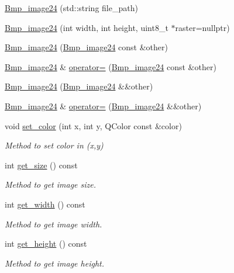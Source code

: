 \begin{DoxyCompactItemize}
\item 
\hyperlink{classBmp__image24_a4790a96366f1e1d8985510ce1e83d576}{Bmp\+\_\+image24} (std\+::string file\+\_\+path)
\item 
\hyperlink{classBmp__image24_a62cde711e1fe6bb462e9330fc6fff5a9}{Bmp\+\_\+image24} (int width, int height, uint8\+\_\+t $\ast$raster=nullptr)
\item 
\hyperlink{classBmp__image24_a10a35b5d6550d4caeb2e1d488dfbf6a4}{Bmp\+\_\+image24} (\hyperlink{classBmp__image24}{Bmp\+\_\+image24} const \&other)
\item 
\hyperlink{classBmp__image24}{Bmp\+\_\+image24} \& \hyperlink{classBmp__image24_a6772b44faac5bbc628b1a433499f6303}{operator=} (\hyperlink{classBmp__image24}{Bmp\+\_\+image24} const \&other)
\item 
\hyperlink{classBmp__image24_a9f725fe5a381fb97c6f65965e1bfe549}{Bmp\+\_\+image24} (\hyperlink{classBmp__image24}{Bmp\+\_\+image24} \&\&other)
\item 
\hyperlink{classBmp__image24}{Bmp\+\_\+image24} \& \hyperlink{classBmp__image24_abf58cf4ee3498687e1f163e122cd458b}{operator=} (\hyperlink{classBmp__image24}{Bmp\+\_\+image24} \&\&other)
\item 
void \hyperlink{classBmp__image24_ad9dca8f678dfd33fd5ec985b8f03b77f}{set\+\_\+color} (int x, int y, Q\+Color const \&color)
\begin{DoxyCompactList}\small\item\em Method to set color in (x,y) \end{DoxyCompactList}\item 
int \hyperlink{classBmp__image24_a575b96b6764ce9901e30ef7558034a71}{get\+\_\+size} () const 
\begin{DoxyCompactList}\small\item\em Method to get image size. \end{DoxyCompactList}\item 
int \hyperlink{classBmp__image24_a5f5c2a29d89c5fbaa1b3312ae755adea}{get\+\_\+width} () const 
\begin{DoxyCompactList}\small\item\em Method to get image width. \end{DoxyCompactList}\item 
int \hyperlink{classBmp__image24_a5226e91244f5bd4eaae3dd50192d4c6d}{get\+\_\+height} () const 
\begin{DoxyCompactList}\small\item\em Method to get image height. \end{DoxyCompactList}\item 

\end{DoxyCompactItemize}
